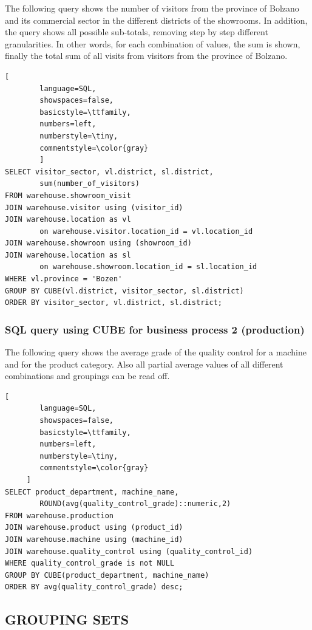 \documentclass[letterpaper,12pt]{article}
\begin{document}
The following query shows the number of visitors from the province of Bolzano and its commercial sector in the different districts of the showrooms. In addition, the query shows all possible sub-totals, removing step by step different granularities. In other words, for each combination of values, the sum is shown, finally the total sum of all visits from visitors from the province of Bolzano.

\begin{lstlisting}[
        language=SQL,
        showspaces=false,
        basicstyle=\ttfamily,
        numbers=left,
        numberstyle=\tiny,
        commentstyle=\color{gray}
        ]
SELECT visitor_sector, vl.district, sl.district, 
        sum(number_of_visitors)
FROM warehouse.showroom_visit
JOIN warehouse.visitor using (visitor_id)
JOIN warehouse.location as vl 
        on warehouse.visitor.location_id = vl.location_id 
JOIN warehouse.showroom using (showroom_id)
JOIN warehouse.location as sl 
        on warehouse.showroom.location_id = sl.location_id
WHERE vl.province = 'Bozen'
GROUP BY CUBE(vl.district, visitor_sector, sl.district)
ORDER BY visitor_sector, vl.district, sl.district;
\end{lstlisting}    

\subsubsection{SQL query using CUBE for business process 2 (production)}

The following query shows the average grade of the quality control for a machine and for the product category. Also all partial average values of all different combinations and groupings can be read off.

\begin{lstlisting}[
        language=SQL,
        showspaces=false,
        basicstyle=\ttfamily,
        numbers=left,
        numberstyle=\tiny,
        commentstyle=\color{gray}
     ]
SELECT product_department, machine_name, 
        ROUND(avg(quality_control_grade)::numeric,2)
FROM warehouse.production
JOIN warehouse.product using (product_id)
JOIN warehouse.machine using (machine_id)
JOIN warehouse.quality_control using (quality_control_id)
WHERE quality_control_grade is not NULL
GROUP BY CUBE(product_department, machine_name)
ORDER BY avg(quality_control_grade) desc;	
\end{lstlisting}

\subsection{GROUPING SETS}
\end{document}
